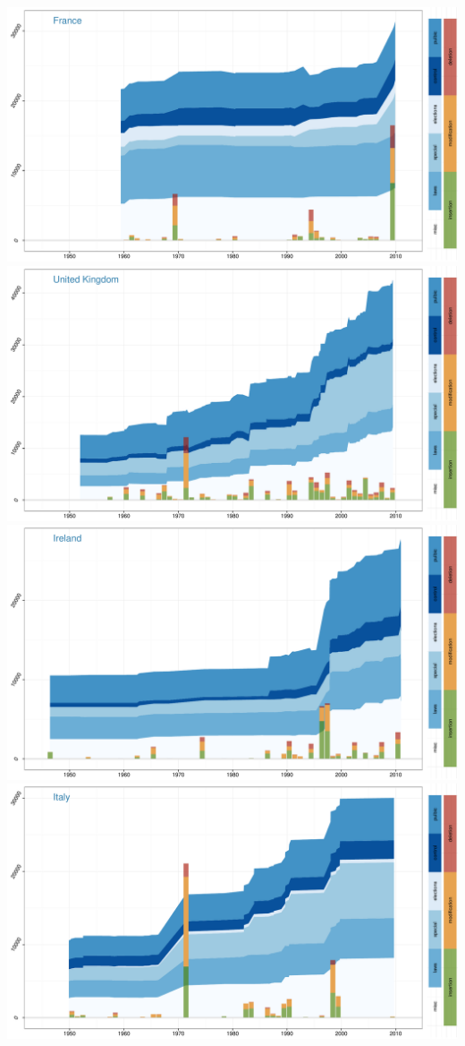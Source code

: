 \documentclass[a4paper, landscape]{article}
\begin{document}
\includegraphics{country_graphs_files/figure-latex/unnamed-chunk-3-8.pdf}
\includegraphics{country_graphs_files/figure-latex/unnamed-chunk-3-9.pdf}
\includegraphics{country_graphs_files/figure-latex/unnamed-chunk-3-10.pdf}
\includegraphics{country_graphs_files/figure-latex/unnamed-chunk-3-11.pdf}
\end{document}
